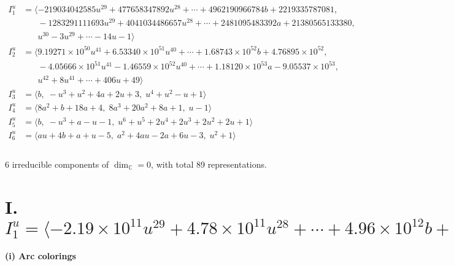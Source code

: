 \documentclass[1p]{elsarticle_modified}
\theoremstyle{definition}
\begin{document}
\begin{align*}
I^u_{1}&=\langle 
-219034042585 u^{29}+477658347892 u^{28}+\cdots+4962190966784 b+2219335787081,\\
\phantom{I^u_{1}}&\phantom{= \langle  }-1283291111693 u^{29}+4041034486657 u^{28}+\cdots+2481095483392 a+21380565133380,\\
\phantom{I^u_{1}}&\phantom{= \langle  }u^{30}-3 u^{29}+\cdots-14 u-1\rangle \\
I^u_{2}&=\langle 
9.19271\times10^{50} u^{41}+6.53340\times10^{51} u^{40}+\cdots+1.68743\times10^{52} b+4.76895\times10^{52},\\
\phantom{I^u_{2}}&\phantom{= \langle  }-4.05666\times10^{51} u^{41}-1.46559\times10^{52} u^{40}+\cdots+1.18120\times10^{53} a-9.05537\times10^{53},\\
\phantom{I^u_{2}}&\phantom{= \langle  }u^{42}+8 u^{41}+\cdots+406 u+49\rangle \\
I^u_{3}&=\langle 
b,\;- u^3+u^2+4 a+2 u+3,\;u^4+u^2- u+1\rangle \\
I^u_{4}&=\langle 
8 a^2+b+18 a+4,\;8 a^3+20 a^2+8 a+1,\;u-1\rangle \\
I^u_{5}&=\langle 
b,\;- u^3+a- u-1,\;u^6+u^5+2 u^4+2 u^3+2 u^2+2 u+1\rangle \\
I^u_{6}&=\langle 
a u+4 b+a+u-5,\;a^2+4 a u-2 a+6 u-3,\;u^2+1\rangle \\
\\
\end{align*}
\raggedright * 6 irreducible components of $\dim_{\mathbb{C}}=0$, with total 89 representations.\\
\newpage
\renewcommand{\arraystretch}{1}
\centering \section*{I. $I^u_{1}= \langle -2.19\times10^{11} u^{29}+4.78\times10^{11} u^{28}+\cdots+4.96\times10^{12} b+2.22\times10^{12},\;-1.28\times10^{12} u^{29}+4.04\times10^{12} u^{28}+\cdots+2.48\times10^{12} a+2.14\times10^{13},\;u^{30}-3 u^{29}+\cdots-14 u-1 \rangle$}
\flushleft \textbf{(i) Arc colorings}\\
\end{document}
